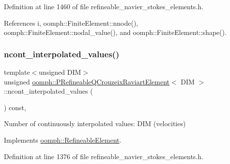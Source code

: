 Definition at line 1460 of file refineable\+\_\+navier\+\_\+stokes\+\_\+elements.\+h.



References i, oomph\+::\+Finite\+Element\+::nnode(), oomph\+::\+Finite\+Element\+::nodal\+\_\+value(), and oomph\+::\+Finite\+Element\+::shape().

\mbox{\label{classoomph_1_1PRefineableQCrouzeixRaviartElement_a8fc2388f81c74e6c9dc32058592ed7d2}} 
\subsubsection{\texorpdfstring{ncont\+\_\+interpolated\+\_\+values()}{ncont\_interpolated\_values()}}
{\footnotesize\ttfamily template$<$unsigned D\+IM$>$ \\
unsigned \hyperlink{classoomph_1_1PRefineableQCrouzeixRaviartElement}{oomph\+::\+P\+Refineable\+Q\+Crouzeix\+Raviart\+Element}$<$ D\+IM $>$\+::ncont\+\_\+interpolated\+\_\+values (\begin{DoxyParamCaption}{ }\end{DoxyParamCaption}) const\hspace{0.3cm}{\ttfamily [inline]}, {\ttfamily [virtual]}}



Number of continuously interpolated values\+: D\+IM (velocities) 



Implements \hyperlink{classoomph_1_1RefineableElement_a53e171a18c9f43f1db90a6876516a073}{oomph\+::\+Refineable\+Element}.



Definition at line 1376 of file refineable\+\_\+navier\+\_\+stokes\+\_\+elements.\+h.

\mbox{\label{classoomph_1_1PRefineableQCrouzeixRaviartElement_a6431bb5f74022a94d074d04ba2f4c7a1}} 
